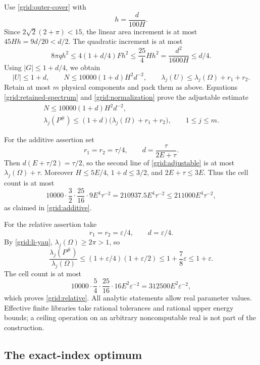 \documentclass[11pt,reqno]{amsart}
\numberwithin{equation}{section}
\newcommand{\abs}[1]{\lvert#1\rvert}
\newcommand{\Om}{\Omega}
\begin{document}
Use \eqref{grid:outer-cover} with
\[
 h=\frac{d}{100H}.
\]
Since \(2\sqrt2(2+\pi)<15\), the linear area increment is at most
\(45Hh=9d/20<d/2\).  The quadratic increment is at most
\[
 8\pi qh^2\le4(1+d/4)Fh^2
       \le\frac{25}{4}Hh^2
       =\frac{d^2}{1600H}\le d/4.
\]
Using \(\abs G\le1+d/4\), we obtain
\[
 \abs U\le1+d,\qquad
 N\le10000(1+d)H^2d^{-2},\qquad
 \lambda_j(U)\le\lambda_j(\Om)+r_1+r_2.
\]
Retain at most \(m\) physical components and pack them as above.
Equations \eqref{grid:retained-spectrum} and
\eqref{grid:normalization} prove the adjustable estimate
\begin{equation}
 \begin{gathered}
  N\le10000(1+d)H^2d^{-2},\\
  \lambda_j(P^\#)
  \le(1+d)\bigl(\lambda_j(\Om)+r_1+r_2\bigr),
  \qquad 1\le j\le m.
 \end{gathered}
 \label{grid:adjustable}
\end{equation}

For the additive assertion set
\[
 r_1=r_2=\tau/4,\qquad d=\frac{\tau}{2E+\tau}.
\]
Then \(d(E+\tau/2)=\tau/2\), so the second line of
\eqref{grid:adjustable} is at most \(\lambda_j(\Om)+\tau\).
Moreover \(H\le5E/4\), \(1+d\le3/2\), and \(2E+\tau\le3E\).
Thus the cell count is at most
\[
 10000\cdot\frac32\cdot\frac{25}{16}\cdot9
      E^4\tau^{-2}
 =210937.5E^4\tau^{-2}
 \le211000E^4\tau^{-2},
\]
as claimed in \eqref{grid:additive}.

For the relative assertion take
\[
 r_1=r_2=\varepsilon/4,\qquad d=\varepsilon/4.
\]
By \eqref{grid:li-yau}, \(\lambda_j(\Om)\ge2\pi>1\), so
\[
 \frac{\lambda_j(P^\#)}{\lambda_j(\Om)}
 \le(1+\varepsilon/4)(1+\varepsilon/2)
 \le1+\frac78\varepsilon\le1+\varepsilon.
\]
The cell count is at most
\[
 10000\cdot\frac54\cdot\frac{25}{16}\cdot16
       E^2\varepsilon^{-2}
 =312500E^2\varepsilon^{-2},
\]
which proves \eqref{grid:relative}.  All analytic statements allow
real parameter values.  Effective finite libraries take rational
tolerances and rational upper energy bounds; a ceiling operation
on an arbitrary noncomputable real is not part of the construction.

\subsection{The exact-index optimum}
\label{grid:exact-index-section}
\end{document}
